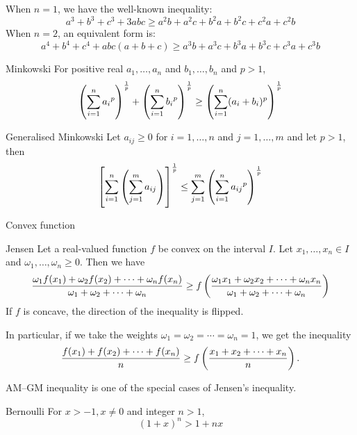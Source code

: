 When $n=1$, we have the well-known inequality:
\[a^3+b^3+c^3+3abc \ge a^2 b+a^2 c+b^2 a+b^2 c+c^2 a+c^2 b\]
When $n=2$, an equivalent form is:
\[a^4+b^4+c^4+abc(a+b+c) \ge a^3 b+a^3 c+b^3 a+b^3 c+c^3 a+c^3 b\]

\begin{thrm}{Minkowski}{}
For positive real $a_1,\dots,a_n$ and $b_1,\dots,b_n$ and $p > 1$,
\begin{equation}
\left(\sum_{i=1}^n{a_i}^p\right)^{\frac{1}{p}} + \left(\sum_{i=1}^n{b_i}^p\right)^{\frac{1}{p}} \ge \left(\sum_{i=1}^n(a_i+b_i)^p\right)^{\frac{1}{p}}
\end{equation}
\end{thrm}

\begin{thrm}{Generalised Minkowski}{}
Let $a_{ij}\ge0$ for $i=1,\dots,n$ and $j=1,\dots,m$ and let $p>1$, then
\begin{equation}
\left[\sum_{i=1}^n\left(\sum_{j=1}^ma_{ij}\right)\right]^\frac{1}{p} \le \sum_{j=1}^m\left(\sum_{i=1}^n{a_{ij}}^p\right)^\frac{1}{p}
\end{equation}
\end{thrm}

\begin{defn}{Convex function}{}

\end{defn}

\begin{thrm}{Jensen}{}
Let a real-valued function $f$ be convex on the interval $I$. Let $x_1, \dots, x_n \in I$ and $\omega_1, \dots, \omega_n \ge 0$. Then we have 
\begin{equation}
\frac{\omega_1f(x_1)+\omega_2f(x_2) + \cdots + \omega_nf(x_n)}{\omega_1+\omega_2+\cdots+\omega_n} \ge f\left(\frac{\omega_1x_1+\omega_2x_2+\cdots+\omega_nx_n}{\omega_1+\omega_2+\cdots+\omega_n}\right)
\end{equation}
If $f$ is concave, the direction of the inequality is flipped.

In particular, if we take the weights $\omega_1=\omega_2=\cdots=\omega_n=1$, we get the inequality
\[ \frac{f(x_1)+f(x_2)+\cdots+f(x_n)}{n} \ge f\left(\frac{x_1+x_2+\cdots+x_n}{n}\right). \]
\end{thrm}

AM--GM inequality is one of the special cases of Jensen's inequality.

\begin{thrm}{Bernoulli}{}
For $x>-1,x\neq0$ and integer $n>1$,
\begin{equation}
(1+x)^n > 1+nx
\end{equation}
\end{thrm}
\pagebreak

